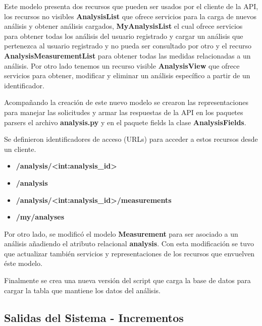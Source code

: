 \documentclass[a4paper,12pt]{article}
\begin{document}
	Este modelo presenta dos recursos que pueden ser usados por el cliente de la API, los recursos no visibles \textbf{AnalysisList} que ofrece servicios para la carga de nuevos análisis y obtener análisis cargados, \textbf{MyAnalysisList} el cual ofrece servicios para obtener todas los análisis del usuario registrado y cargar un análisis que pertenezca al usuario registrado y no pueda ser consultado por otro y el recurso \textbf{AnalysisMeasurementList} para obtener todas las medidas relacionadas a un análisis. Por otro lado tenemos un recurso visible \textbf{AnalysisView} que ofrece servicios para obtener, modificar y eliminar un análisis específico a partir de un identificador.
	
	
	Acompañando la creación de este nuevo modelo se crearon las representaciones para manejar las solicitudes y armar las respuestas de la API en los paquetes parsers el archivo \textbf{analysis.py} y en el paquete fields la clase \textbf{AnalysisFields}.
	
	Se definieron identificadores de acceso (URLs) para acceder a estos recursos desde un cliente.
		\begin{itemize}
			\item \textbf{/analysis/<int:analysis\_id>}
			\item \textbf{/analysis}
			\item \textbf{/analysis/<int:analysis\_id>/measurements}
			\item \textbf{/my/analyses}
		\end{itemize} 
		
	Por otro lado, se modificó el modelo \textbf{Measurement} para ser asociado a un análisis añadiendo el atributo relacional \textbf{analysis}. Con esta modificación se tuvo que actualizar también servicios y representaciones de los recursos que envuelven éste modelo.
	
	Finalmente se crea una nueva versión del script que carga la base de datos para cargar la tabla que mantiene los datos del análisis.

\clearpage
\subsection {Salidas del Sistema - Incrementos}
\end{document}
